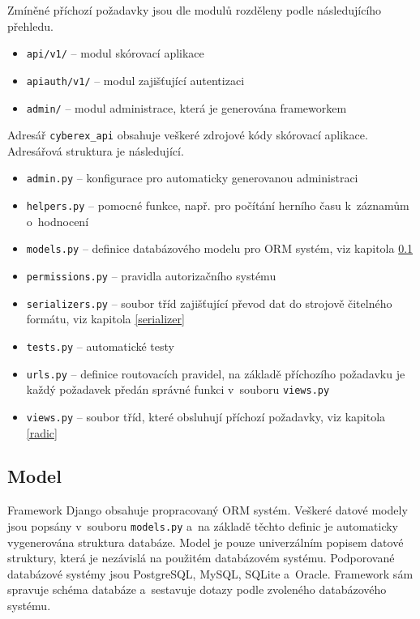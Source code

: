 \documentclass[
  digital,
  twoside,
  table, 
  nolof, 
  nolot
]{fithesis3}
\begin{document}
Zmíněné příchozí požadavky jsou dle modulů rozděleny podle následujícího přehledu.

\begin{itemize}
    \item \texttt{api/v1/} -- modul skórovací aplikace
    \item \texttt{api\-auth/v1/} -- modul zajišťující autentizaci
    \item \texttt{admin/} -- modul administrace, která je generována frameworkem
\end{itemize}

Adresář \texttt{cyberex\_api} obsahuje veškeré zdrojové kódy skórovací aplikace. Adresářová struktura je následující.

\begin{itemize}
    \item \texttt{admin.py} -- konfigurace pro automaticky generovanou administraci
    \item \texttt{helpers.py} -- pomocné funkce, např. pro počítání herního času k~záznamům o~hodnocení
    \item \texttt{models.py} -- definice databázového modelu pro ORM systém, viz kapitola \ref{model}
    \item \texttt{permissions.py} -- pravidla autorizačního systému
    \item \texttt{serializers.py} -- soubor tříd zajišťující převod dat do strojově čitelného formátu, viz kapitola \ref{serializer}
    \item \texttt{tests.py} -- automatické testy
    \item \texttt{urls.py} -- definice routovacích pravidel, na základě příchozího požadavku je každý požadavek předán správné funkci v~souboru \texttt{views.py}
    \item \texttt{views.py} -- soubor tříd, které obsluhují příchozí požadavky, viz kapitola \ref{radic}
\end{itemize}

\subsection{Model}
\label{model}
Framework Django obsahuje propracovaný ORM systém. Veškeré datové modely jsou popsány v~souboru \texttt{models.py} a~na základě těchto definic je automaticky vygenerována struktura databáze. Model je pouze univerzálním popisem datové struktury, která je nezávislá na použitém databázovém systému. Podporované databázové systémy jsou PostgreSQL, MySQL, SQLite a~Oracle. Framework sám spravuje schéma databáze a~sestavuje dotazy podle zvoleného databázového systému.
\end{document}
